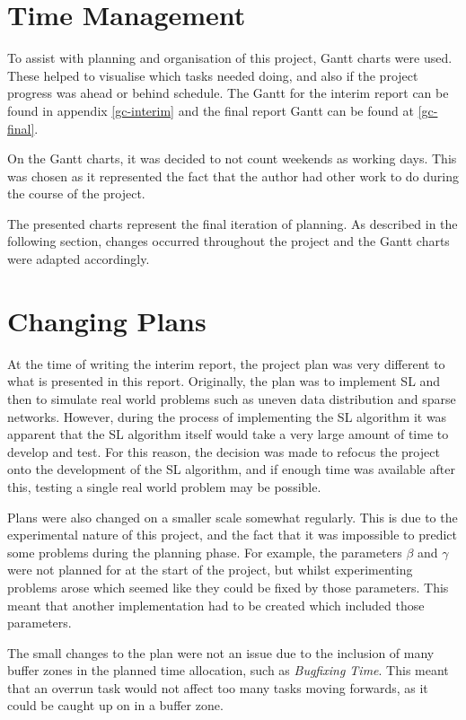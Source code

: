 \section{Time Management}
To assist with planning and organisation of this project, Gantt charts were used. These helped to visualise which tasks needed doing, and also if the project progress was ahead or behind schedule. The Gantt for the interim report can be found in appendix \ref{gc-interim} and the final report Gantt can be found at \ref{gc-final}.

On the Gantt charts, it was decided to not count weekends as working days. This was chosen as it represented the fact that the author had other work to do during the course of the project.

The presented charts represent the final iteration of planning. As described in the following section, changes occurred throughout the project and the Gantt charts were adapted accordingly.

\section{Changing Plans}
At the time of writing the interim report, the project plan was very different to what is presented in this report. Originally, the plan was to implement SL and then to simulate real world problems such as uneven data distribution and sparse networks. However, during the process of implementing the SL algorithm it was apparent that the SL algorithm itself would take a very large amount of time to develop and test. For this reason, the decision was made to refocus the project onto the development of the SL algorithm, and if enough time was available after this, testing a single real world problem may be possible.

Plans were also changed on a smaller scale somewhat regularly. This is due to the experimental nature of this project, and the fact that it was impossible to predict some problems during the planning phase. For example, the parameters $\beta$ and $\gamma$ were not planned for at the start of the project, but whilst experimenting problems arose which seemed like they could be fixed by those parameters. This meant that another implementation had to be created which included those parameters.

The small changes to the plan were not an issue due to the inclusion of many buffer zones in the planned time allocation, such as \emph{Bugfixing Time}. This meant that an overrun task would not affect too many tasks moving forwards, as it could be caught up on in a buffer zone.

